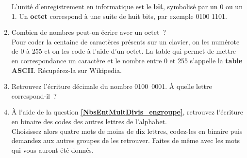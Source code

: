 \begin{TP}
\begin{enumerate}
 L'unité d'enregistrement en informatique est le \textbf{bit}, symbolisé par un 0 ou un 1. Un \textbf{octet} correspond à une suite de huit bits, par exemple 0100 1101.
 
 \item Combien de nombres peut-on écrire avec un octet ? \\[0.75em]
Pour coder la centaine de caractères présents sur un clavier, on les numérote de 0 à 255 et on les code à l'aide d'un octet. La table qui permet de mettre en correspondance un caractère et le nombre entre 0 et 255 s'appelle la \textbf{table ASCII}. Récupérez-la sur Wikipedia.
 
 \item Retrouvez l'écriture décimale du nombre 0100 0001. À quelle lettre correspond-il ?
 \item À l'aide de la question \textbf{\ref{NbsEntMultDivis_engroupe}}, retrouvez l'écriture en binaire des codes des autres lettres de l'alphabet.\\[0.75em]
Choisissez alors quatre mots de moins de dix lettres, codez-les en binaire puis demandez aux autres groupes de les retrouver. Faites de même avec les mots qui vous auront été donnés.
 \end{enumerate}
\end{TP}